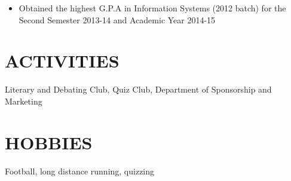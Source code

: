 \documentclass[margin]{res}
\begin{document}
\begin{resume}
\begin{itemize}
				  \item[] Obtained the highest G.P.A in Information Systems (2012 batch) for the Second Semester 2013-14 and Academic Year 2014-15
                  \end{itemize}
			   	
\section{ACTIVITIES}
                Literary and Debating Club, Quiz Club, Department of Sponsorship and Marketing
                

 
\section{HOBBIES}         Football, long distance running, quizzing
 
\end{resume} 
\end{document}
